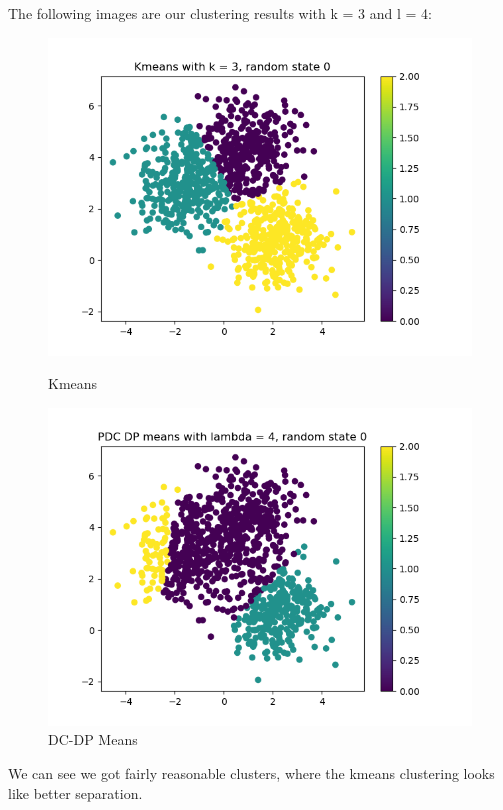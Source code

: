 \documentclass[12pt]{article}
\begin{document}
The following images are our clustering results with k = 3 and l = 4:
\begin{figure}
    \begin{minipage}{0.5\textwidth}
    \centering
    \includegraphics[scale=0.4]{images/task2_drs_rs0__k3}
    \caption{Kmeans}
    \end{minipage}
    \begin{minipage}{0.5\textwidth}
    \centering
    \includegraphics[scale=0.4]{images/task2_drs_rs0__l4}
    \caption{DC-DP Means}
    \end{minipage}\label{fig:figure}
\end{figure}
\newpage
We can see we got fairly reasonable clusters, where the kmeans clustering looks like better separation.
\\
\end{document}
